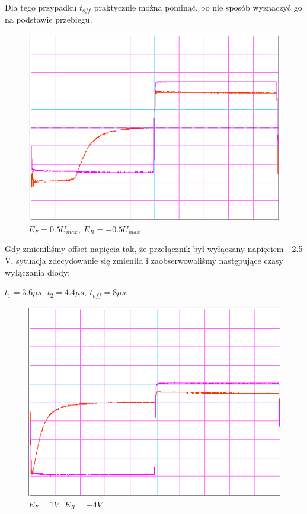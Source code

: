 \documentclass[a4paper,11pt]{article}
\begin{document}
Dla tego przypadku \( t_{off} \) praktycznie można pominąć, bo nie sposób wyznaczyć go na podstawie przebiegu.

\begin{figure} [H]
  \begin{center}
    \includegraphics{../Obrazki_i_tekst/obrobione/1bsciety.png}
    \caption{\( E_F = 0.5 U_{max}, \ E_R = -0.5 U_{max}\)}
  \end{center}
\end{figure}

Gdy zmieniliśmy offset napięcia tak, że przełącznik był wyłączany napięciem - 2.5 V, sytuacja zdecydowanie się zmieniła i zaobserwowaliśmy następujące czasy wyłączania diody:

 \(t_1 = 3.6 \mu s,\ t_2 = 4.4 \mu s,\ t_{off} = 8 \mu s \).

\begin{figure} [H]
  \begin{center}
    \includegraphics{../Obrazki_i_tekst/obrobione/1csciety.png}
    \caption{\( E_F = 1V, \ E_R = -4 V\)}
  \end{center}
\end{figure}
\end{document}
